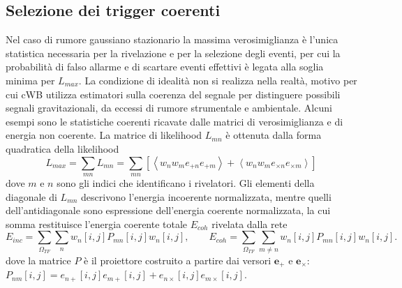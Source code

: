 \subsection{Selezione dei trigger coerenti}
Nel caso di rumore gaussiano stazionario la massima verosimiglianza è l'unica statistica necessaria per la rivelazione e per la selezione degli eventi, per cui la probabilità di falso allarme e di scartare eventi effettivi è legata alla soglia minima per $L_{max}$. 
La condizione di idealità non si realizza nella realtà, motivo per cui cWB utilizza estimatori sulla coerenza del segnale per distinguere possibili segnali gravitazionali, da eccessi di rumore strumentale e ambientale.
Alcuni esempi sono le statistiche coerenti ricavate dalle matrici di verosimiglianza e di energia non coerente.
La matrice di likelihood $L_{mn}$ è ottenuta dalla forma quadratica della likelihood
\begin{equation}
	L_{max} = \sum_{mn}L_{mn} = \sum_{mn}\left[\left< w_nw_me_{+n}e_{+m} \right> + \left< w_nw_me_{\times n}e_{\times m} \right>\right]
	\label{eqn:likelihood_matrix}
\end{equation}
dove $m\text{ e }n$ sono gli indici che identificano i rivelatori\cite{Klimenko_2008}. Gli elementi della diagonale di $L_{mn}$ descrivono l'energia incoerente normalizzata, mentre quelli dell'antidiagonale sono espressione dell'energia coerente normalizzata, la cui somma restituisce l'energia coerente totale $E_{coh}$ rivelata dalla rete
\begin{equation}
	E_{inc} = \sum_{\Omega_{TF}}\sum_{n}w_n[i,j]P_{mn}[i,j]w_n[i,j],
	\quad\quad
	E_{coh} = \sum_{\Omega_{TF}}\sum_{m\neq n}w_n[i,j]P_{mn}[i,j]w_n[i,j].
\end{equation}
dove la matrice $P$ è il proiettore costruito a partire dai versori $\mathbf{e}_+$ e $\mathbf{e}_\times$: $P_{nm}[i,j]=e_{n+}[i,j]e_{m+}[i,j]+e_{n\times}[i,j]e_{m\times}[i,j]$\cite{Klimenko_2016}. 

